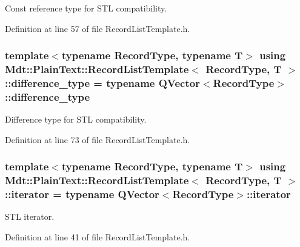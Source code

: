 Const reference type for S\+TL compatibility. 



Definition at line 57 of file Record\+List\+Template.\+h.

\subsubsection[{\texorpdfstring{difference\+\_\+type}{difference_type}}]{\setlength{\rightskip}{0pt plus 5cm}template$<$typename Record\+Type, typename T$>$ using {\bf Mdt\+::\+Plain\+Text\+::\+Record\+List\+Template}$<$ Record\+Type, T $>$\+::{\bf difference\+\_\+type} =  typename Q\+Vector$<$Record\+Type$>$\+::{\bf difference\+\_\+type}}\hypertarget{class_mdt_1_1_plain_text_1_1_record_list_template_a93665d213efef18c64b3470164f8e57d}{}\label{class_mdt_1_1_plain_text_1_1_record_list_template_a93665d213efef18c64b3470164f8e57d}


Difference type for S\+TL compatibility. 



Definition at line 73 of file Record\+List\+Template.\+h.

\subsubsection[{\texorpdfstring{iterator}{iterator}}]{\setlength{\rightskip}{0pt plus 5cm}template$<$typename Record\+Type, typename T$>$ using {\bf Mdt\+::\+Plain\+Text\+::\+Record\+List\+Template}$<$ Record\+Type, T $>$\+::{\bf iterator} =  typename Q\+Vector$<$Record\+Type$>$\+::{\bf iterator}}\hypertarget{class_mdt_1_1_plain_text_1_1_record_list_template_a5b0caae56b05a38e53539cad1da8cd12}{}\label{class_mdt_1_1_plain_text_1_1_record_list_template_a5b0caae56b05a38e53539cad1da8cd12}


S\+TL iterator. 



Definition at line 41 of file Record\+List\+Template.\+h.

